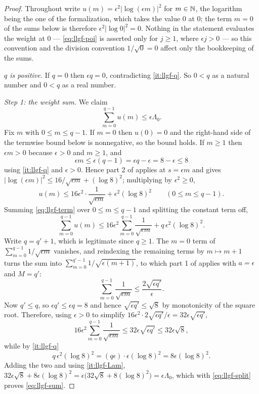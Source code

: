 \begin{proof}
Throughout write $u(m)=\epsilon^2|\log(\epsilon m)|^2$ for $m\in\mathbb{N}$, the
logarithm being the one of the formalization, which takes the value $0$ at $0$;
the term $m=0$ of the sums below is therefore $\epsilon^2|\log0|^2=0$. Nothing
in the statement evaluates the weight at $0$ --- \eqref{eq:llgf-poi} is
asserted only for $j\ge1$, where $\epsilon j>0$ --- so this convention and the
division convention $1/\sqrt0=0$ affect only the bookkeeping of the sums.

\emph{$q$ is positive.} If $q=0$ then $\epsilon q=0$, contradicting
\ref{it:llgf-q}. So $0<q$ as a natural number and $0<q$ as a real number.

\emph{Step 1: the weight sum.} We claim
\begin{equation}\label{eq:llgf-sum}
  \sum_{m=0}^{q-1}u(m)\le\epsilon\Lambda_0 .
\end{equation}
Fix $m$ with $0\le m\le q-1$. If $m=0$ then $u(0)=0$ and the right-hand side of
the termwise bound below is nonnegative, so the bound holds. If $m\ge1$ then
$\epsilon m>0$ because $\epsilon>0$ and $m\ge1$, and
\[
  \epsilon m\le\epsilon(q-1)=\epsilon q-\epsilon=8-\epsilon\le8
\]
using \ref{it:llgf-q} and $\epsilon>0$. Hence part 2 of
 applies at $s=\epsilon m$ and gives
$|\log(\epsilon m)|^2\le16/\sqrt{\epsilon m}+(\log8)^2$; multiplying by
$\epsilon^2\ge0$,
\begin{equation}\label{eq:llgf-term}
  u(m)\le16\epsilon^2\cdot\frac1{\sqrt{\epsilon m}}+\epsilon^2(\log8)^2
  \qquad(0\le m\le q-1).
\end{equation}
Summing \eqref{eq:llgf-term} over $0\le m\le q-1$ and splitting the constant
term off,
\begin{equation}\label{eq:llgf-split}
  \sum_{m=0}^{q-1}u(m)
  \le16\epsilon^2\sum_{m=0}^{q-1}\frac1{\sqrt{\epsilon m}}
    +q\,\epsilon^2(\log8)^2 .
\end{equation}
Write $q=q'+1$, which is legitimate since $q\ge1$. The $m=0$ term of
$\sum_{m=0}^{q-1}1/\sqrt{\epsilon m}$ vanishes, and reindexing the remaining
terms by $m\mapsto m+1$ turns the sum into
$\sum_{m=0}^{q'-1}1/\sqrt{\epsilon(m+1)}$, to which part 1 of
 applies with $a=\epsilon$ and $M=q'$:
\begin{equation}\label{eq:llgf-harm}
  \sum_{m=0}^{q-1}\frac1{\sqrt{\epsilon m}}
   \le\frac{2\sqrt{\epsilon q'}}{\epsilon} .
\end{equation}
Now $q'\le q$, so $\epsilon q'\le\epsilon q=8$ and hence
$\sqrt{\epsilon q'}\le\sqrt8$ by monotonicity of the square root. Therefore,
using $\epsilon>0$ to simplify $16\epsilon^2\cdot2\sqrt{\epsilon q'}/\epsilon
=32\epsilon\sqrt{\epsilon q'}$,
\[
  16\epsilon^2\sum_{m=0}^{q-1}\frac1{\sqrt{\epsilon m}}
   \le32\epsilon\sqrt{\epsilon q'}\le32\epsilon\sqrt8 ,
\]
while by \ref{it:llgf-q}
\[
  q\,\epsilon^2(\log8)^2=(q\epsilon)\cdot\epsilon(\log8)^2
   =8\epsilon(\log8)^2 .
\]
Adding the two and using \ref{it:llgf-Lam},
$32\epsilon\sqrt8+8\epsilon(\log8)^2
=\epsilon\bigl(32\sqrt8+8(\log8)^2\bigr)=\epsilon\Lambda_0$, which with
\eqref{eq:llgf-split} proves \eqref{eq:llgf-sum}.


\end{proof}
